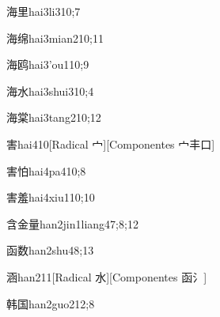 \begin{verbete}{海里}{hai3li3}{10;7}
\end{verbete}

\begin{verbete}{海绵}{hai3mian2}{10;11}
\end{verbete}

\begin{verbete}{海鸥}{hai3'ou1}{10;9}
\end{verbete}

\begin{verbete}{海水}{hai3shui3}{10;4}
\end{verbete}

\begin{verbete}{海棠}{hai3tang2}{10;12}
\end{verbete}

\begin{verbete}{害}{hai4}{10}[Radical 宀][Componentes 宀丰口]
\end{verbete}

\begin{verbete}{害怕}{hai4pa4}{10;8}
\end{verbete}

\begin{verbete}{害羞}{hai4xiu1}{10;10}
\end{verbete}

\begin{verbete}{含金量}{han2jin1liang4}{7;8;12}
\end{verbete}

\begin{verbete}{函数}{han2shu4}{8;13}
\end{verbete}

\begin{verbete}{涵}{han2}{11}[Radical 水][Componentes 函氵]
\end{verbete}

\begin{verbete}{韩国}{han2guo2}{12;8}
\end{verbete}

